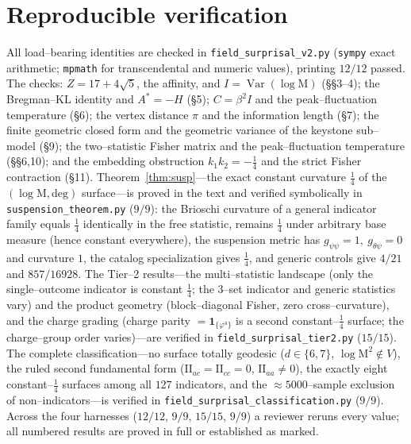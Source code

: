 \documentclass[11pt]{article}
\theoremstyle{definition}
\newcommand{\ph}{\varphi}
\newcommand{\Mah}{\mathrm{M}}
\newcommand{\Var}{\operatorname{Var}}
\begin{document}
\section{Reproducible verification}\label{app:verify}
All load--bearing identities are checked in \texttt{field\_surprisal\_v2.py} (\texttt{sympy} exact
arithmetic; \texttt{mpmath} for transcendental and numeric values), printing $12/12$ passed. The
checks: $Z=17+4\sqrt5$, the affinity, and $I=\Var(\log\Mah)$ (\S\S3--4); the Bregman--$\mathrm{KL}$
identity and $A^\ast=-H$ (\S5); $C=\beta^2 I$ and the peak--fluctuation temperature (\S6); the
vertex distance $\pi$ and the information length (\S7); the finite geometric closed form and the
geometric variance of the keystone sub--model (\S9); the two--statistic Fisher matrix and the
peak--fluctuation temperature (\S\S6,10); and the embedding obstruction $k_1k_2=-\tfrac14$ and the
strict Fisher contraction (\S11). Theorem~\ref{thm:susp}---the exact constant curvature $\tfrac14$ of
the $(\log\Mah,\mathrm{deg})$ surface---is proved in the text and verified symbolically in
\texttt{suspension\_theorem.py} ($9/9$): the Brioschi curvature of a general indicator family equals
$\tfrac14$ identically in the free statistic, remains $\tfrac14$ under arbitrary base measure (hence
constant everywhere), the suspension metric has $g_{\psi\psi}=1,\ g_{\theta\psi}=0$ and curvature
$1$, the catalog specialization gives $\tfrac14$, and generic controls give $4/21$ and $857/16928$.
The Tier--2 results---the multi--statistic landscape (only the single--outcome indicator is
constant $\tfrac14$; the $3$--set indicator and generic statistics vary) and the product geometry
(block--diagonal Fisher, zero cross--curvature), and the charge grading (charge parity
$=\mathbf 1_{\{\ph^4\}}$ is a second constant--$\tfrac14$ surface; the charge--group order varies)---are
verified in \texttt{field\_surprisal\_tier2.py} ($15/15$). The complete classification---no surface
totally geodesic ($d\in\{6,7\}$, $\log\Mah^2\notin V$), the ruled second fundamental form
($\mathrm{II}_{ac}=\mathrm{II}_{cc}=0$, $\mathrm{II}_{aa}\neq0$), the exactly eight constant--$\tfrac14$
surfaces among all $127$ indicators, and the $\approx5000$--sample exclusion of non--indicators---is
verified in \texttt{field\_surprisal\_classification.py} ($9/9$). Across the four harnesses ($12/12$,
$9/9$, $15/15$, $9/9$) a reviewer reruns every value; all numbered results are proved in full or
established as marked.
\end{document}
